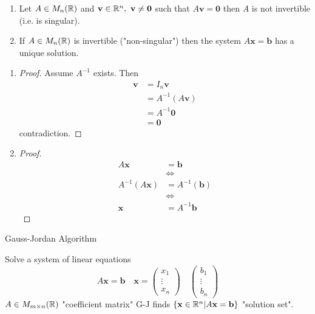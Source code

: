 \documentclass[10pt, a4paper]{article}
\newcommand{\mbf}[1]{\mathbf{#1}}
\begin{document}
\begin{lemma}\phantom{}
    \begin{enumerate}[label = (\roman*)]
        \item Let $A \in M_n(\mathbb{R})$ and $\mbf{v} \in \R ^ n,\ \mbf{v} \neq \mbf{0}$ such that $A\mbf{v} = \mbf{0}$ then $A$ is not invertible (i.e. is singular).
        \item If $A \in M_n(\mathbb{R})$ is invertible ("non-singular") then the system $A\mbf{x} = \mbf{b}$ has a unique solution.
    \end{enumerate}
    \begin{enumerate}[label = (\roman*)]
        \item
        \begin{proof}
            Assume $A ^ {-1}$ exists. Then
            \begin{align*}
                \mbf{v} &= I_n \mbf{v} \\
                &= A ^ {-1}(A\mbf{v}) \\
                &= A ^ {-1}\mbf{0} \\
                &= \mbf{0}
            \end{align*}
            contradiction.
        \end{proof}
        \item
        \begin{proof}
            \begin{align*}
                A\mbf{x} &= \mbf{b} \\
                &\iff \\
                A ^ {-1}(A\mbf{x}) &= A ^ {-1}(\mbf{b}) \\
                &\iff \\
                \mbf{x} &= A ^ {-1}\mbf{b}
            \end{align*}
        \end{proof}
    \end{enumerate}
\end{lemma}

Gauss-Jordan Algorithm

Solve a system of linear equations
\[
A\mbf{x} = \mbf{b}\quad\mbf{x} = \begin{pmatrix}
    x_1 \\ \vdots \\ x_n
\end{pmatrix}
\quad
\begin{pmatrix}
    b_1 \\ \vdots \\ b_n
\end{pmatrix}
\]
$A \in M_{m \times n}(\mathbb{R})$ "coefficient matrix"
G-J finds $\{\mbf{x} \in \R ^ n | A\mbf{x} = \mbf{b}\}$ "solution set".
\end{document}
